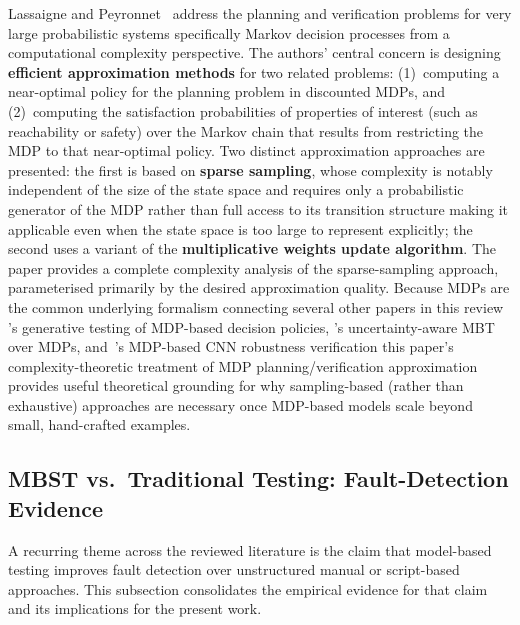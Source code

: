 Lassaigne and Peyronnet~\cite{lassaigne2012approximate} address the
planning and verification problems for very large probabilistic
systems specifically Markov decision processes from a computational
complexity perspective.  The authors' central concern is designing
\textbf{efficient approximation methods} for two related problems:
(1)~computing a near-optimal policy for the planning problem in
discounted MDPs, and (2)~computing the satisfaction probabilities of
properties of interest (such as reachability or safety) over the Markov
chain that results from restricting the MDP to that near-optimal policy.
Two distinct approximation approaches are presented: the first is based
on \textbf{sparse sampling}, whose complexity is notably independent of
the size of the state space and requires only a probabilistic generator
of the MDP rather than full access to its transition structure making
it applicable even when the state space is too large to represent
explicitly; the second uses a variant of the \textbf{multiplicative
weights update algorithm}.  The paper provides a complete complexity
analysis of the sparse-sampling approach, parameterised primarily by the
desired approximation quality.  Because MDPs are the common underlying
formalism connecting several other papers in this
review \cite{li2023generative}'s generative testing of MDP-based
decision policies, \cite{camilli2021uncertainty}'s uncertainty-aware MBT
over MDPs, and~\cite{liu2025prg4cnn}'s MDP-based CNN robustness
verification this paper's complexity-theoretic treatment of MDP
planning/verification approximation provides useful theoretical grounding
for why sampling-based (rather than exhaustive) approaches are necessary
once MDP-based models scale beyond small, hand-crafted examples.





\subsection{MBST vs.\ Traditional Testing: Fault-Detection Evidence}
\label{sec:lr_fault_detection}

A recurring theme across the reviewed literature is the claim that
model-based testing improves fault detection over unstructured manual
or script-based approaches.  This subsection consolidates the
empirical evidence for that claim and its implications for the
present work.

